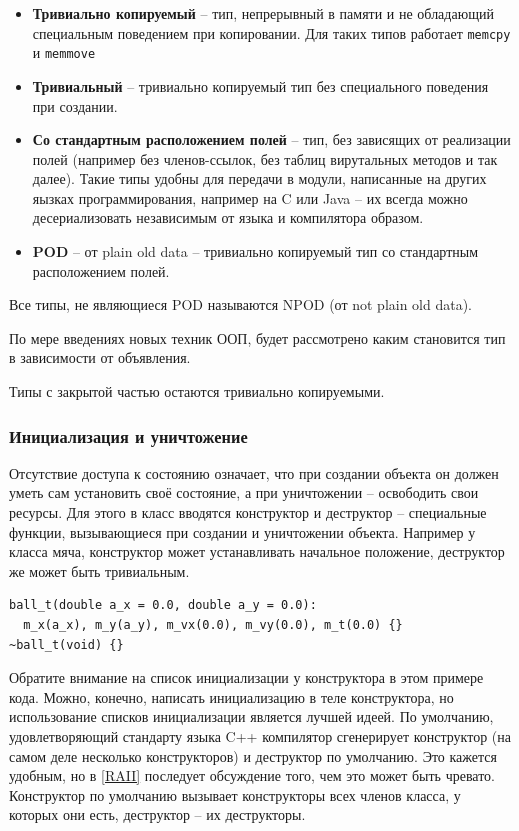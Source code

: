 \documentclass[a4paper,12pt,oneside]{article}
\begin{document}
\begin{itemize}
\item \textbf{Тривиально копируемый} -- тип, непрерывный в памяти и не обладающий специальным поведением при копировании. Для таких типов работает \lstinline!memcpy! и \lstinline!memmove! 
\item \textbf{Тривиальный} -- тривиально копируемый тип без специального поведения при создании.
\item \textbf{Со стандартным расположением полей} -- тип, без зависящих от реализации полей (например без членов-ссылок, без таблиц вирутальных методов и так далее). Такие типы удобны для передачи в модули, написанные на других яызках программирования, например на C или Java -- их всегда можно десериализовать независимым от языка и компилятора образом.
\item \textbf{POD} -- от plain old data -- тривиально копируемый тип со стандартным расположением полей.
\end{itemize}

Все типы, не являющиеся POD называются NPOD (от not plain old data).

По мере введениях новых техник ООП, будет рассмотрено каким становится тип в зависимости от объявления.

Типы с закрытой частью остаются тривиально копируемыми.

\subsubsection{Инициализация и уничтожение}\label{ConstrDestr}

Отсутствие доступа к состоянию означает, что при создании объекта он должен уметь сам установить своё состояние, а при уничтожении – освободить свои ресурсы. Для этого в класс вводятся конструктор и деструктор – специальные функции, вызывающиеся при создании и уничтожении объекта. Например у класса мяча, конструктор может устанавливать начальное положение, деструктор же может быть тривиальным.

\begin{lstlisting}
ball_t(double a_x = 0.0, double a_y = 0.0):
  m_x(a_x), m_y(a_y), m_vx(0.0), m_vy(0.0), m_t(0.0) {}
~ball_t(void) {}
\end{lstlisting}

Обратите внимание на список инициализации у конструктора в этом примере кода. Можно, конечно, написать инициализацию в теле конструктора, но использование списков инициализации является лучшей идеей. По умолчанию, удовлетворяющий стандарту языка C++ компилятор сгенерирует конструктор (на самом деле несколько конструкторов) и деструктор по умолчанию. Это кажется удобным, но в \ref{RAII} последует обсуждение того, чем это может быть чревато. Конструктор по умолчанию вызывает конструкторы всех членов класса, у которых они есть, деструктор -- их деструкторы.
\end{document}
